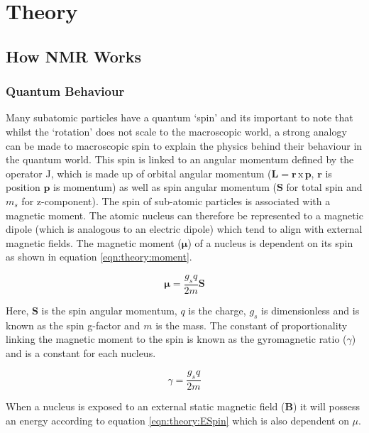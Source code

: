 \chapter{Theory}
\label{Chap:Theory}

\section{How \ac{NMR} Works}
\subsection{Quantum Behaviour}

Many subatomic particles have a quantum `spin' and its important to note that whilst the `rotation' does not scale to the macroscopic world, a strong analogy can be made to macroscopic spin to explain the physics behind their behaviour in the quantum world. This spin is linked to an angular momentum defined by the operator J, which is made up of orbital angular momentum ($\mathbf{L} = \mathbf{r}\, \textrm{x} \, \mathbf{p}$, $\mathbf{r}$ is position $\mathbf{p}$ is momentum) as well as spin angular momentum ($\mathbf{S}$ for total spin and $m_s$ for z-component). The spin of sub-atomic particles is associated with a magnetic moment. The atomic nucleus can therefore be represented to a magnetic dipole (which is analogous to an electric dipole) which tend to align with external magnetic fields. The magnetic moment ($\mathbf{\mu}$) of a nucleus is dependent on its spin as shown in equation \ref{eqn:theory:moment}.

\begin{equation}
    \mathbf{\mu} = \frac{g_sq}{2m} \mathbf{S}
    \label{eqn:theory:moment}
\end{equation}

Here, $\mathbf{S}$ is the spin angular momentum, $q$ is the charge, $g_s$ is dimensionless and is known as the spin g-factor and $m$ is the mass. The constant of proportionality linking the magnetic moment to the spin is known as the gyromagnetic ratio ($\gamma$) and is a constant for each nucleus. 

\begin{equation}
    \gamma = \frac{g_sq}{2m}
    \label{eqn:theory:gyro}
\end{equation}

When a nucleus is exposed to an external static magnetic field ($\mathbf{B}$) it will possess an energy according to equation \ref{eqn:theory:ESpin} which is also dependent on $\mu$.

